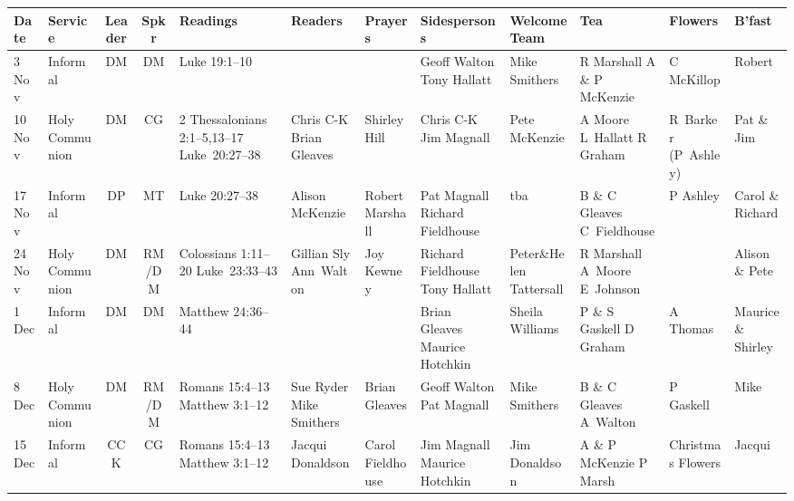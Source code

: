 \documentclass[10pt]{article}
\begin{document}
\begin{center}
{\begin{tabular}{|%
p{}| %
p{}| %
c| %
c| %
X{}| %
X{}| %
p{}| %
X{}| %
X{}| %
X{}| %
p{}| %
p{}|}\hline %
 Date & Service & Leader & Spkr & Readings & Readers & Prayers &
Sidespersons & Welcome Team & Tea &  Flowers & B'fast   \\ \hline %
\hline
\toprule
3 Nov & Informal & DM & DM & Luke 19:1--10 &   &   & Geoff Walton Tony Hallatt & Mike Smithers  &  R Marshall A \& P McKenzie & C McKillop & Robert \\ \hline
10 Nov & Holy Communion & DM & CG & 2 Thessalonians 2:1--5,13--17 Luke~20:27--38 & Chris C-K Brian Gleaves & Shirley Hill & Chris C-K Jim Magnall & Pete McKenzie & A Moore L~Hallatt  R Graham & R~Barker (P~Ashley) & Pat \& Jim \\ \hline
17 Nov & Informal & DP & MT & Luke 20:27--38 & Alison McKenzie & Robert Marshall & Pat Magnall Richard Fieldhouse & tba & B \& C Gleaves C~Fieldhouse & P Ashley & Carol \& Richard \\ \hline
24 Nov & Holy Communion & DM & RM/DM & Colossians 1:11--20 Luke~23:33--43 & Gillian Sly Ann~Walton & Joy Kewney &   Richard Fieldhouse Tony Hallatt  & Peter\&Helen Tattersall & R Marshall A~Moore E~Johnson  &   & Alison \& Pete \\ \hline
1 Dec & Informal & DM & DM & Matthew 24:36--44  &  &   & Brian Gleaves Maurice Hotchkin  & Sheila Williams &  P \& S Gaskell D Graham  & A Thomas & Maurice \& Shirley \\ \hline
8 Dec & Holy Communion & DM & RM/DM & Romans 15:4--13 Matthew 3:1--12  & Sue Ryder Mike Smithers & Brian Gleaves & Geoff Walton Pat Magnall & Mike Smithers  & B \& C Gleaves A~Walton & P Gaskell & Mike \\ \hline
15 Dec & Informal & CCK & CG & Romans 15:4--13 Matthew 3:1--12  & Jacqui Donaldson & Carol Fieldhouse & Jim Magnall Maurice Hotchkin & Jim Donaldson &   A \& P McKenzie P Marsh & Christmas Flowers & Jacqui \\ \hline

\end{tabular}}
\end{center}
\end{document}
